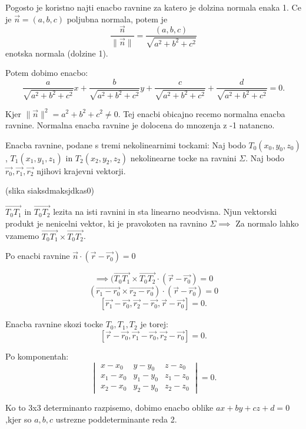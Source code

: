 \documentclass{report}
\begin{document}
Pogosto je koristno najti enacbo ravnine za katero je dolzina normala enaka 1. Ce je $\vec{n} = (a,b,c)$ poljubna normala, potem je
\[
\frac{\vec{n}}{\|\vec{n}\|} = \frac{(a,b,c)}{\sqrt{a^{2} + b^{2} + c^{2}} }
\]
enotska normala (dolzine 1).


Potem dobimo enacbo:
\[
\frac{a}{\sqrt{a^{2} + b^{2} + c^{2}}} x + \frac{b}{\sqrt{a^{2} + b^{2} + c^{2}}} y + \frac{c}{\sqrt{a^{2} + b^{2} + c^{2}}} + \frac{d}{\sqrt{a^{2} + b^{2} + c^{2}}} = 0
.\]

Kjer $\|\vec{n}\|^{2} = a^{2} + b^2 + c^2 \neq 0$. Tej enacbi obicajno recemo normalna enacba ravnine. Normalna enacba ravnine je dolocena do mnozenja z -1 natancno.

Enacba ravnine, podane s tremi nekolinearnimi tockami:
Naj bodo $T_0(x_0,y_0,z_0)$, $T_1(x_1,y_1,z_1)$ in $T_2(x_2,y_2,z_2)$ nekolinearne tocke na ravnini $\Sigma$.
Naj bodo  $\vec{r_0},\vec{r_1},\vec{r_2}$ njihovi krajevni vektorji.


(slika siaksdmaksjdkas0)

$\vec{T_0T_1}$ in $\vec{T_0T_2}$ lezita na isti ravnini in sta linearno neodvisna. Njun vektorski produkt je nenicelni vektor, ki je pravokoten na ravnino $\Sigma \implies$ Za normalo lahko vzamemo $\vec{T_0T_1} \times \vec{T_0T_2}$.

Po enacbi ravnine $\vec{n} \cdot \left( \vec{r} - \vec{r_0} \right) = 0 $

\[
	\implies (\vec{T_0T_1} \times \vec{T_0T_2} \cdot \left( \vec{r} - \vec{r_0} \right) = 0
\]
\[
	\left( \vec{r_1 - r_0} \times \vec{ r_2 - r_0}\right) \cdot \left( \vec{r} - \vec{r_0} \right) = 0
\]
\[
	\left[  \vec{r_1} - \vec{r_0} , \vec{r_2} - \vec{r_0}, \vec{r} - \vec{r_0} \right] = 0
.\]

Enacba ravnine skozi tocke $T_0,T_1,T_2$ je torej:
\[
	\left[  \vec{r} - \vec{r_0}, \vec{r_1} - \vec{r_0}, \vec{r_2} - \vec{r_0}  \right] = 0
.\]

Po komponentah:
\[
\begin{vmatrix}
	x-x_0 & y-y_0 & z-z_0 \\
	x_1-x_0 & y_1-y_0 & z_1 - z_0 \\
	x_2-x_0 & y_2-y_0 & z_2-z_0
\end{vmatrix} = 0
.\]



Ko to 3x3 determinanto razpisemo, dobimo enacbo oblike $ax + by + cz + d = 0$,kjer so  $a,b,c$ ustrezne poddeterminante reda 2.
\end{document}
